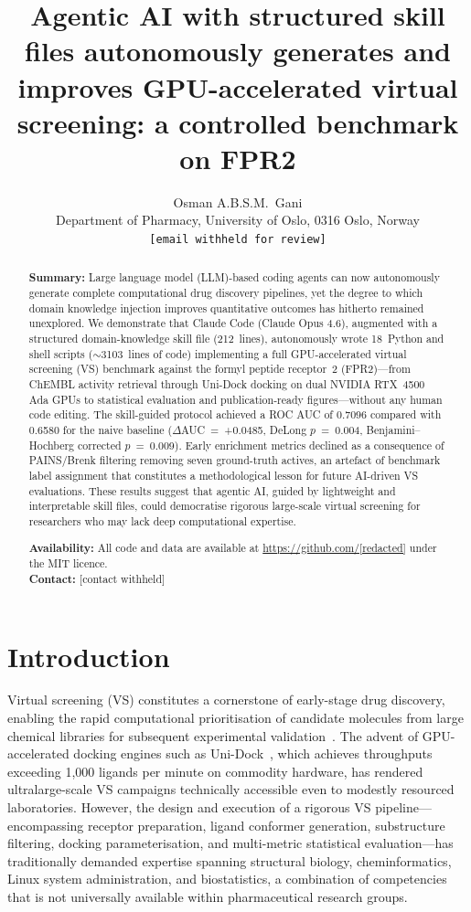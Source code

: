 \documentclass[10pt,a4paper,twocolumn]{article}
\title{\textbf{Agentic AI with structured skill files autonomously generates and improves GPU-accelerated virtual screening: a controlled benchmark on FPR2}}
\author{
  Osman A.B.S.M.\ Gani\\
  \small Department of Pharmacy, University of Oslo, 0316 Oslo, Norway\\
  \small \texttt{[email withheld for review]}
}
\date{}
\newcommand{\NSCRIPTS}{18}
\newcommand{\NLINES}{3103}
\newcommand{\NSKILLLINES}{212}
\begin{document}
\maketitle

\begin{abstract}
\textbf{Summary:}
Large language model (LLM)-based coding agents can now autonomously generate complete computational drug discovery pipelines, yet the degree to which domain knowledge injection improves quantitative outcomes has hitherto remained unexplored. We demonstrate that Claude Code (Claude Opus 4.6), augmented with a structured domain-knowledge skill file (\NSKILLLINES{}~lines), autonomously wrote \NSCRIPTS{}~Python and shell scripts ($\sim$\NLINES{}~lines of code) implementing a full GPU-accelerated virtual screening (VS) benchmark against the formyl peptide receptor~2 (FPR2)---from ChEMBL activity retrieval through Uni-Dock docking on dual NVIDIA RTX~4500 Ada GPUs to statistical evaluation and publication-ready figures---without any human code editing. The skill-guided protocol achieved a ROC AUC of 0.7096 compared with 0.6580 for the naive baseline ($\Delta$AUC~=~+0.0485, DeLong $p$~=~0.004, Benjamini--Hochberg corrected $p$~=~0.009). Early enrichment metrics declined as a consequence of PAINS/Brenk filtering removing seven ground-truth actives, an artefact of benchmark label assignment that constitutes a methodological lesson for future AI-driven VS evaluations. These results suggest that agentic AI, guided by lightweight and interpretable skill files, could democratise rigorous large-scale virtual screening for researchers who may lack deep computational expertise.

\noindent\textbf{Availability:}
All code and data are available at \url{https://github.com/[redacted]} under the MIT licence.\\
\textbf{Contact:} [contact withheld]
\end{abstract}

\section*{Introduction}

Virtual screening (VS) constitutes a cornerstone of early-stage drug discovery, enabling the rapid computational prioritisation of candidate molecules from large chemical libraries for subsequent experimental validation~\citep{schneider2020}. The advent of GPU-accelerated docking engines such as Uni-Dock~\citep{unidock2023}, which achieves throughputs exceeding 1,000 ligands per minute on commodity hardware, has rendered ultralarge-scale VS campaigns technically accessible even to modestly resourced laboratories. However, the design and execution of a rigorous VS pipeline---encompassing receptor preparation, ligand conformer generation, substructure filtering, docking parameterisation, and multi-metric statistical evaluation---has traditionally demanded expertise spanning structural biology, cheminformatics, Linux system administration, and biostatistics, a combination of competencies that is not universally available within pharmaceutical research groups.
\end{document}
